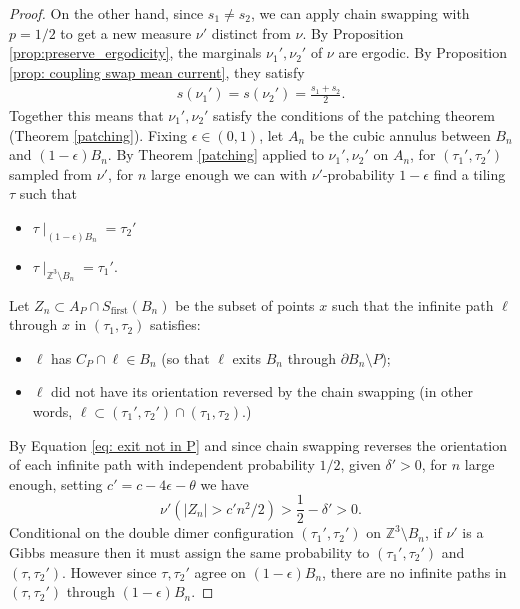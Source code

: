 \documentclass[11pt]{article}
\theoremstyle{remark}
\theoremstyle{definition}
\newcommand{\m}[1]{\mathbb{#1}}
\begin{document}
\begin{proof}
    On the other hand, since $s_1\neq s_2$, we can apply chain swapping with $p=1/2$ to get a new measure $\nu'$ distinct from $\nu$. By Proposition \ref{prop:preserve_ergodicity}, the marginals $\nu_1',\nu_2'$ of $\nu$ are ergodic. By Proposition \ref{prop: coupling swap mean current}, they satisfy
    \begin{align*}
        s(\nu_1') = s(\nu_2') = \frac{s_1+s_2}{2}.
    \end{align*}
    Together this means that $\nu_1',\nu_2'$ satisfy the conditions of the patching theorem (Theorem \ref{patching}). Fixing $\epsilon\in(0,1)$, let $A_n$ be the cubic annulus between $B_n$ and $(1-\epsilon)B_n$. By Theorem \ref{patching} applied to $\nu_1',\nu_2'$ on $A_n$, for $(\tau_1',\tau_2')$ sampled from $\nu'$, for $n$ large enough we can with $\nu'$-probability $1-\epsilon$ find a tiling $\tau$ such that 
    \begin{itemize}
        \item $\tau\mid_{(1-\epsilon)B_n} = \tau_2'$
        \item $\tau\mid_{\m Z^3\setminus B_n} = \tau_1'$.
    \end{itemize}
    Let $Z_n\subset A_P \cap S_{\text{first}}(B_n)$ be the subset of points $x$ such that the infinite path $\ell$ through $x$ in $(\tau_1,\tau_2)$ satisfies:
    \begin{itemize}
        \item $\ell$ has $C_P\cap \ell\in B_n$ (so that $\ell$ exits $B_n$ through $\partial B_n\setminus P$);
        \item  $\ell$ did not have its orientation reversed by the chain swapping (in other words, $\ell \subset (\tau_1',\tau_2')\cap (\tau_1,\tau_2)$.)
    \end{itemize}
    By Equation \eqref{eq: exit not in P} and since chain swapping reverses the orientation of each infinite path with independent probability $1/2$, given $\delta'>0$, for $n$ large enough, setting $c'=c-4\epsilon -\theta$ we have
    \begin{equation}\label{eq:Zn size bound}
        \nu' ({|Z_n|} > c'n^2/2 ) > \frac{1}{2}-\delta' > 0.
    \end{equation}
    Conditional on the double dimer configuration $(\tau_1',\tau_2')$ on $\m Z^3\setminus B_n$, if $\nu'$ is a Gibbs measure then it must assign the same probability to $(\tau_1',\tau_2')$ and $(\tau,\tau_2')$. However since $\tau,\tau_2'$ agree on $(1-\epsilon)B_n$, there are no infinite paths in $(\tau,\tau_2')$ through $(1-\epsilon)B_n$. 
        

\end{proof}
\end{document}
